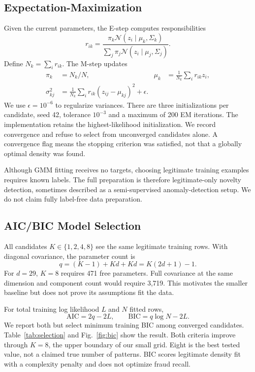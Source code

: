 \documentclass[conference]{IEEEtran}
\begin{document}
\subsection{Expectation-Maximization}
Given the current parameters, the E-step computes responsibilities
\begin{equation}
r_{ik}=\frac{\pi_k\mathcal{N}(z_i\mid\mu_k,\Sigma_k)}{\sum_j\pi_j\mathcal{N}(z_i\mid\mu_j,\Sigma_j)}.
\end{equation}
Define $N_k=\sum_i r_{ik}$. The M-step updates
\begin{align}
\pi_k&=N_k/N, &
\mu_k&=\frac{1}{N_k}\sum_i r_{ik}z_i,\\
\sigma^2_{kj}&=\frac{1}{N_k}\sum_i r_{ik}(z_{ij}-\mu_{kj})^2+\epsilon.
\end{align}
We use $\epsilon=10^{-6}$ to regularize variances. There are three initializations per candidate, seed 42, tolerance $10^{-3}$ and a maximum of 200 EM iterations. The implementation retains the highest-likelihood initialization. We record convergence and refuse to select from unconverged candidates alone. A convergence flag means the stopping criterion was satisfied, not that a globally optimal density was found.

Although GMM fitting receives no targets, choosing legitimate training examples requires known labels. The full preparation is therefore legitimate-only novelty detection, sometimes described as a semi-supervised anomaly-detection setup. We do not claim fully label-free data preparation.

\subsection{AIC/BIC Model Selection}
All candidates $K\in\{1,2,4,8\}$ see the same legitimate training rows. With diagonal covariance, the parameter count is
\begin{equation}
q=(K-1)+Kd+Kd=K(2d+1)-1.
\end{equation}
For $d=29$, $K=8$ requires 471 free parameters. Full covariance at the same dimension and component count would require 3,719. This motivates the smaller baseline but does not prove its assumptions fit the data.

For total training log likelihood $L$ and $N$ fitted rows,
\begin{equation}
\mathrm{AIC}=2q-2L,\qquad\mathrm{BIC}=q\log N-2L.
\end{equation}
We report both but select minimum training BIC among converged candidates. Table~\ref{tab:selection} and Fig.~\ref{fig:bic} show the result. Both criteria improve through $K=8$, the upper boundary of our small grid. Eight is the best tested value, not a claimed true number of patterns. BIC scores legitimate density fit with a complexity penalty and does not optimize fraud recall.
\end{document}

